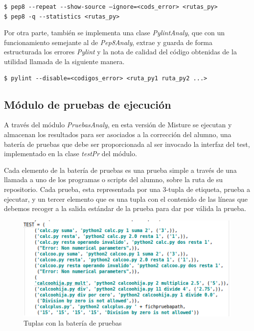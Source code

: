 \begin{center}
\begin{verbatim}
$ pep8 --repeat --show-source –ignore=<cods_error> <rutas_py>
$ pep8 -q --statistics <rutas_py>
\end{verbatim}
\end{center}


Por otra parte, también se implementa una clase \textit{PylintAnaly}, que con un funcionamiento semejante al de \textit{Pep8Analy}, extrae y guarda de forma estructurada los errores \textit{Pylint} y la nota de calidad del código obtenidas de la utilidad llamada de la siguiente manera.

\begin{center}
\begin{verbatim}
$ pylint --disable=<codigos_error> <ruta_py1 ruta_py2 ...>
\end{verbatim}
\end{center}


\subsection{Módulo de pruebas de ejecución}

A través del módulo \textit{PruebasAnaly}, en esta versión de Misture se ejecutan y almacenan los resultados para ser asociados a la corrección del alumno, una batería de pruebas que debe ser proporcionada al ser invocado la interfaz del test, implementado en la clase \textit{testPr} del módulo.

Cada elemento de la batería de pruebas es una prueba simple a través de una llamada a uno de los programas o scripts del alumno, sobre la ruta de su repositorio. Cada prueba, esta representada por una 3-tupla de etiqueta, prueba a ejecutar, y un tercer elemento que es una tupla con el contenido de las líneas que debemos recoger a la salida estándar de la prueba para dar por válida la prueba.


\begin{figure}[H]
   \centering
   \includegraphics[width=16cm]{img/Selection_024_testcodigo}
   \caption{Tuplas con la batería de pruebas}
   \label{figura:testcodigo}
\end{figure}

